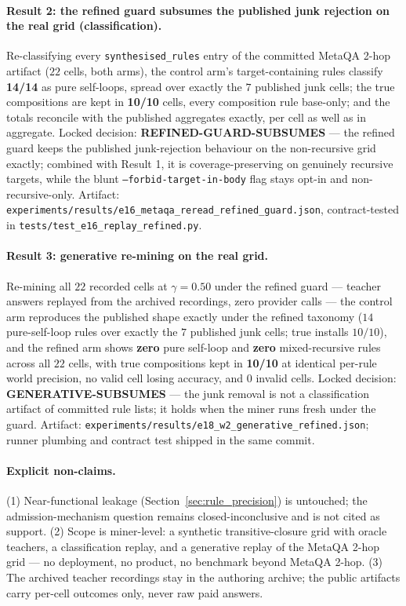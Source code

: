 \documentclass[11pt]{article}
\theoremstyle{plain}
\begin{document}
\paragraph{Result 2: the refined guard subsumes the published junk rejection on the real grid (classification).}
Re-classifying every \texttt{synthesised\_rules} entry of the committed
MetaQA 2-hop artifact ($22$ cells, both arms), the control arm's
target-containing rules classify \textbf{14/14} as pure self-loops, spread
over exactly the $7$ published junk cells; the true compositions are kept
in \textbf{10/10} cells, every composition rule base-only; and the totals
reconcile with the published aggregates exactly, per cell as well as in
aggregate. Locked decision: \textbf{REFINED-GUARD-SUBSUMES} --- the
refined guard keeps the published junk-rejection behaviour on the
non-recursive grid exactly; combined with Result 1, it is
coverage-preserving on genuinely recursive targets, while the blunt
\texttt{--forbid-target-in-body} flag stays opt-in and non-recursive-only.
Artifact: \texttt{experiments/results/e16\_metaqa\_reread\_refined\_guard.json},
contract-tested in \texttt{tests/test\_e16\_replay\_refined.py}.

\paragraph{Result 3: generative re-mining on the real grid.}
Re-mining all $22$ recorded cells at $\gamma{=}0.50$ under the refined
guard --- teacher answers replayed from the archived recordings, zero
provider calls --- the control arm reproduces the published shape exactly
under the refined taxonomy ($14$ pure-self-loop rules over exactly the $7$
published junk cells; true installs $10/10$), and the refined arm shows
\textbf{zero} pure self-loop and \textbf{zero} mixed-recursive rules across
all $22$ cells, with true compositions kept in \textbf{10/10} at identical
per-rule world precision, no valid cell losing accuracy, and $0$ invalid
cells. Locked decision: \textbf{GENERATIVE-SUBSUMES} --- the junk removal
is not a classification artifact of committed rule lists; it holds when
the miner runs fresh under the guard. Artifact:
\texttt{experiments/results/e18\_w2\_generative\_refined.json}; runner
plumbing and contract test shipped in the same commit.

\paragraph{Explicit non-claims.}
(1) Near-functional leakage (Section~\ref{sec:rule_precision}) is
untouched; the admission-mechanism question remains closed-inconclusive
and is not cited as support. (2) Scope is miner-level: a synthetic
transitive-closure grid with oracle teachers, a classification replay, and
a generative replay of the MetaQA 2-hop grid --- no deployment, no
product, no benchmark beyond MetaQA 2-hop. (3) The archived teacher
recordings stay in the authoring archive; the public artifacts carry
per-cell outcomes only, never raw paid answers.
\end{document}
